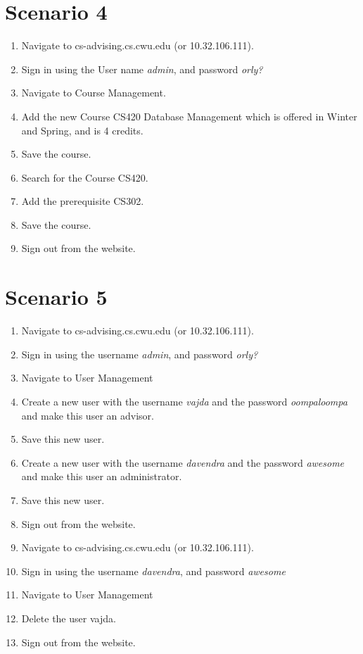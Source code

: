 \documentclass{article}
\begin{document}
\section{Scenario 4}
\begin{enumerate}
\item Navigate to cs-advising.cs.cwu.edu (or 10.32.106.111).
\item Sign in using the User name \textit{admin}, and password \textit{orly?}
\item Navigate to Course Management.
\item Add the new Course CS420 Database Management which is offered in Winter and Spring, and is 4 credits.
\item Save the course.
\item Search for the Course CS420.
\item Add the prerequisite CS302.
\item Save the course.
\item Sign out from the website.
\end{enumerate}

\section{Scenario 5}
\begin{enumerate}
\item Navigate to cs-advising.cs.cwu.edu (or 10.32.106.111).
\item Sign in using the username \textit{admin}, and password \textit{orly?}
\item Navigate to User Management
\item Create a new user with the username \textit{vajda} and the password \textit{oompaloompa} and make this user an advisor.
\item Save this new user.
\item Create a new user with the username \textit{davendra} and the password \textit{awesome} and make this user an administrator.
\item Save this new user.
\item Sign out from the website.
\item Navigate to cs-advising.cs.cwu.edu (or 10.32.106.111).
\item Sign in using the username \textit{davendra}, and password \textit{awesome}
\item Navigate to User Management
\item Delete the user vajda.
\item Sign out from the website.
\end{enumerate}
\end{document}
